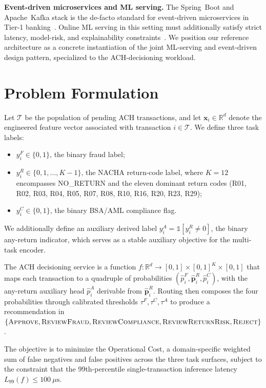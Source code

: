 \documentclass[11pt,a4paper]{article}
\begin{document}
\textbf{Event-driven microservices and ML serving.} The Spring~Boot and
Apache~Kafka stack is the de-facto standard for event-driven microservices
in Tier-1 banking~\cite{newman2015,kreps2014}. Online ML serving in this
setting must additionally satisfy strict latency, model-risk, and
explainability constraints~\cite{polyzotis2017,sculley2015}. We position
our reference architecture as a concrete instantiation of the joint
ML-serving and event-driven design pattern, specialized to the
ACH-decisioning workload.

\section{Problem Formulation}
\label{sec:problem}

Let $\mathcal{T}$ be the population of pending ACH transactions, and let
$\mathbf{x}_i \in \mathbb{R}^{d}$ denote the engineered feature vector
associated with transaction $i \in \mathcal{T}$. We define three task
labels:

\begin{itemize}
    \item $y^{F}_i \in \{0,1\}$, the binary fraud label;
    \item $y^{R}_i \in \{0,1,\ldots,K-1\}$, the NACHA return-code label,
    where $K=12$ encompasses NO\_RETURN and the eleven dominant return
    codes (R01, R02, R03, R04, R05, R07, R08, R10, R16, R20, R23, R29);
    \item $y^{C}_i \in \{0,1\}$, the binary BSA/AML compliance flag.
\end{itemize}

We additionally define an auxiliary derived label $y^{A}_i =
\mathbb{1}[y^{R}_i \neq 0]$, the binary any-return indicator, which serves
as a stable auxiliary objective for the multi-task encoder.

The ACH decisioning service is a function $f: \mathbb{R}^{d}
\rightarrow [0,1] \times [0,1]^{K} \times [0,1]$ that maps each transaction
to a quadruple of probabilities
$(\hat{p}^{F}_i, \hat{\mathbf{p}}^{R}_i, \hat{p}^{C}_i)$, with the
any-return auxiliary head $\hat{p}^{A}_i$ derivable from
$\hat{\mathbf{p}}^{R}_i$. Routing then composes the four probabilities
through calibrated thresholds $\tau^{F}, \tau^{C}, \tau^{A}$ to produce a
recommendation in $\{\textsc{Approve},\textsc{ReviewFraud},
\textsc{ReviewCompliance}, \textsc{ReviewReturnRisk}, \textsc{Reject}\}$.

The objective is to minimize the Operational Cost, a domain-specific
weighted sum of false negatives and false positives across the three
task surfaces, subject to the constraint that the 99th-percentile
single-transaction inference latency $L_{99}(f) \leq 100~\mu\text{s}$.
\end{document}
